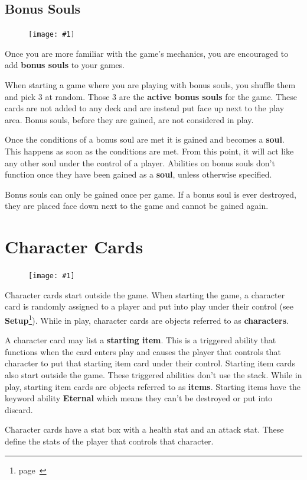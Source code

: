 \documentclass[
  fontsize=10pt,
  paper=a5,
  version=last,
  chapterprefix=true,
  bindingoffset=5mm,
  ]{scrbook}
\newcommand{\cardw}{0.3\textwidth}
\newcommand{\cardfigv}[1]{
    \begin{figure}
        \texttt{[image: \#1]}
    \end{figure}
}
\begin{document}
    \subsection{Bonus Souls}
    \cardfigv{assets/bonus_soul.png}
    Once you are more familiar with the game’s mechanics, you are encouraged to add \textbf{bonus souls} to your games.

    When starting a game where you are playing with bonus souls, you shuffle them and pick 3 at random. Those 3 are the \textbf{active bonus souls} for the game. These cards are not added to any deck and are instead put face up next to the play area. Bonus souls, before they are gained, are not considered in play.

    Once the conditions of a bonus soul are met it is gained and becomes a \textbf{soul}. This happens as soon as the conditions are met. From this point, it will act like any other soul under the control of a player. Abilities on bonus souls don’t function once they have been gained as a \textbf{soul}, unless otherwise specified.

    Bonus souls can only be gained once per game. If a bonus soul is ever destroyed, they are placed face down next to the game and cannot be gained again.

    \section{Character Cards}
    \cardfigv{assets/character.png}
    Character cards start outside the game. When starting the game, a character card is randomly assigned to a player and put into play under their control (see \textbf{Setup}\footnote{page~\pageref{setup}}). While in play, character cards are objects referred to as \textbf{characters}.
    
    A character card may list a \textbf{starting item}. This is a triggered ability that functions when the card enters play and causes the player that controls that character to put that starting item card under their control. Starting item cards also start outside the game. These triggered abilities don’t use the stack. While in play, starting item cards are objects referred to as \textbf{items}. Starting items have the keyword ability \textbf{Eternal} which means they can’t be destroyed or put into discard.
    
    Character cards have a stat box with a health stat and an attack stat. These define the stats of the player that controls that character.
    
\end{document}
